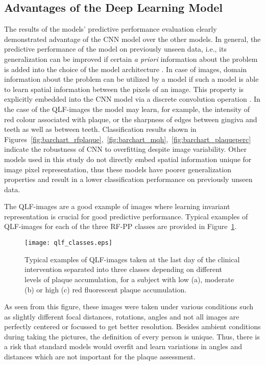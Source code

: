 \documentclass[runningheads,a4paper]{llncs}
\begin{document}
\subsection{Advantages of the Deep Learning Model}
The results of the models' predictive performance evaluation clearly demonstrated advantage of the CNN model over the other models. In general, the predictive performance of the model on previously unseen data, i.e., its generalization can be improved if certain \textit{a priori} information about the problem is added into the choice of the model architecture \cite{lecun1989backpropagation}. In case of images, domain information about the problem can be utilized by a model if such a model is able to learn spatial information between the pixels of an image. This property is explicitly embedded into the CNN model via a discrete convolution operation \cite{LeCun2015}. In the case of the QLF-images the model may learn, for example, the intensity of red colour associated with plaque, or the sharpness of edges between gingiva and teeth as well as between teeth. Classification results shown in Figures~\ref{fig:barchart_rfplaque},~\ref{fig:barchart_mqh},~\ref{fig:barchart_plaqueperc} indicate the robustness of CNN to overfitting despite image variability. Other models used in this study do not directly embed spatial information unique for image pixel representation, thus these models have poorer generalization properties and result in a lower classification performance on previously unseen data.

The QLF-images are a good example of images where learning invariant representation is crucial for good predictive performance. Typical examples of QLF-images for each of the three RF-PP classes are provided in Figure~\ref{fig:qlf_images_classes}.
\begin{figure}[]
\centering
\texttt{[image: qlf\_classes.eps]}
\caption{Typical examples of QLF-images taken at the last day of the clinical intervention separated into three classes depending on different levels of plaque accumulation, for a subject with low (a), moderate (b) or high (c) red fluorescent plaque accumulation.}
\label{fig:qlf_images_classes}
\end{figure}
As seen from this figure, these images were taken under various conditions such as slightly different focal distances, rotations, angles and not all images are perfectly centered or focussed to get better resolution. Besides ambient conditions during taking the pictures, the definition of every person is unique. Thus, there is a risk that standard models would overfit and learn variations in angles and distances which are not important for the plaque assessment.
\end{document}
